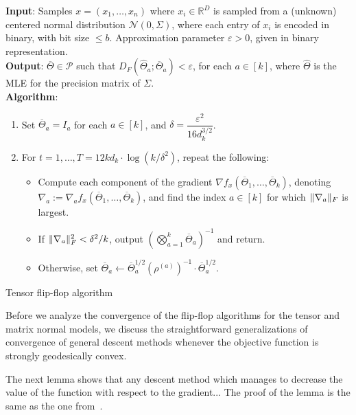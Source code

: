 \documentclass[aos]{imsart}
\theoremstyle{definition}
\numberwithin{equation}{section}
\DeclarePairedDelimiter{\norm}{\lVert}{\rVert}
\newcommand{\R}{{\mathbb{R}}}
\newcommand{\otheta}{\overline{\Theta}}
\newcommand{\htheta}{\widehat{\Theta}}
\newcommand{\eps}{\varepsilon}
\newcommand{\cN}{\mathcal{N}}
\newcommand{\SPD}{\mathcal{P}}
\newcommand{\samp}{x}
\begin{document}
\begin{Algorithm}
\textbf{Input}: Samples $\samp = (\samp_1, \ldots, \samp_n)$ where $\samp_i \in \R^D$ is sampled from a (unknown) centered normal distribution $\cN(0, \Sigma)$, where each entry of $\samp_i$ is encoded in binary, with bit size $\le b$. Approximation parameter $\eps > 0$, given in binary representation. \\[.3ex]

\textbf{Output}: $\otheta \in \SPD$ such that $D_F(\htheta_a; \otheta_a) < \eps$, for each $a \in [k]$, where $\htheta$ is the MLE for the precision matrix of $\Sigma$. \\[.3ex]

\textbf{Algorithm}:
\begin{enumerate}
\item\label{it:flip-flop step 1} Set $\otheta_a = I_a$ for each $a \in [k]$, and $\delta = \dfrac{\eps^2}{16 d_k^{3/2}}$.
\item\label{it:flip-flop step 2} For $t=1,\dots,T = 12 k d_k \cdot \log(k/\delta^2)$, repeat the following:
\begin{itemize}
\item Compute each component of the gradient $\nabla f_{\samp}(\otheta_1, \ldots, \otheta_k)$, denoting $\nabla_a := \nabla_a f_{\samp}(\otheta_1, \ldots, \otheta_k)$, and find the index $a \in [k]$ for which $\norm{\nabla_a}_F$ is largest.
\item
If $\norm{\nabla_a}_F^2 < \delta^2/k$, output $\left( \bigotimes_{a =1}^k \otheta_a \right)^{-1}$ and return.
\item Otherwise, set $\otheta_a \leftarrow \otheta_a^{1/2} (\rho^{(a)})^{-1} \cdot \otheta_a^{1/2}$.
\end{itemize}
\end{enumerate}
\caption{Tensor flip-flop algorithm}\label{alg:flip-flop}
\end{Algorithm}

Before we analyze the convergence of the flip-flop algorithms for the tensor and matrix normal models, we discuss the straightforward generalizations of convergence of general descent methods whenever the objective function is strongly geodesically convex.

The next lemma shows that any descent method which manages to decrease the value of the function with respect to the gradient...
The proof of the lemma is the same as the one from~\cite[Lemma 4.8]{FM20}.
\end{document}
